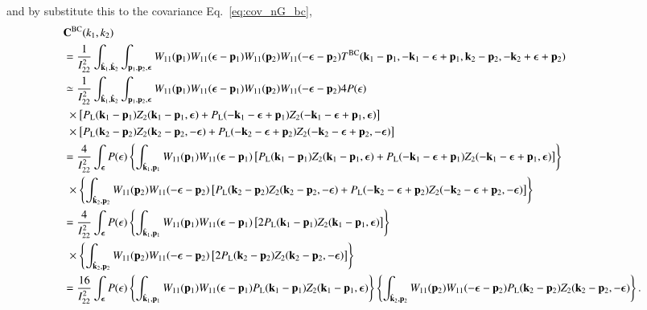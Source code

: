 \documentclass[onecolumn,showpacs,amsmath,amssymb,prd,floatfix,preprintnumbers]{revtex4}
\newcommand{\bk}{{\bf k}}
\newcommand{\bp}{{\bf p}}
\begin{document}
and by substitute this to the covariance Eq.~\ref{eq:cov_nG_bc}, 
\begin{align}
  &{\bf C}^{\rm BC}(k_1,k_2) \nonumber \\ 
  &= \frac{1}{I_{22}^2} \int_{\hat{\bk}_1,\hat{\bk}_2} \int_{\bp_1,\bp_2,{\boldsymbol \epsilon}} W_{11}(\bp_1) W_{11}({\boldsymbol \epsilon}-\bp_1) W_{11}(\bp_2) W_{11}(-{\boldsymbol \epsilon}-\bp_2) T^{\rm BC}(\bk_1-\bp_1, -\bk_1-{\boldsymbol \epsilon}+\bp_1, \bk_2-\bp_2, -\bk_2+{\boldsymbol \epsilon}+\bp_2) \nonumber \\
  &\simeq \frac{1}{I_{22}^2} \int_{\hat{\bk}_1,\hat{\bk}_2} \int_{\bp_1,\bp_2,{\boldsymbol \epsilon}} W_{11}(\bp_1) W_{11}({\boldsymbol \epsilon}-\bp_1) W_{11}(\bp_2) W_{11}(-{\boldsymbol \epsilon}-\bp_2) 4P(\epsilon) \nonumber \\
  &\,\, \times \left[ P_{\rm L}(\bk_1-\bp_1) Z_2(\bk_1-\bp_1, {\boldsymbol \epsilon}) + P_{\rm L}(-\bk_1-{\boldsymbol \epsilon}+\bp_1) Z_2(-\bk_1-{\boldsymbol \epsilon}+\bp_1, {\boldsymbol \epsilon}) \right] \nonumber \\
  &\,\, \times \left[ P_{\rm L}(\bk_2-\bp_2) Z_2(\bk_2-\bp_2, -{\boldsymbol \epsilon}) + P_{\rm L}(-\bk_2-{\boldsymbol \epsilon}+\bp_2) Z_2(-\bk_2-{\boldsymbol \epsilon}+\bp_2, -{\boldsymbol \epsilon}) \right] \nonumber \\
  &= \frac{4}{I_{22}^2} \int_{\boldsymbol \epsilon} P(\epsilon) 
  \left\{ \int_{\hat{\bk}_1,\bp_1} W_{11}(\bp_1) W_{11}({\boldsymbol \epsilon}-\bp_1) \left[ P_{\rm L}(\bk_1-\bp_1) Z_2(\bk_1-\bp_1, {\boldsymbol \epsilon}) + P_{\rm L}(-\bk_1-{\boldsymbol \epsilon}+\bp_1) Z_2(-\bk_1-{\boldsymbol \epsilon}+\bp_1, {\boldsymbol \epsilon}) \right] \right\} \nonumber \\
  &\,\, \times \left\{ \int_{\hat{\bk}_2,\bp_2} W_{11}(\bp_2) W_{11}(-{\boldsymbol \epsilon}-\bp_2) \left[ P_{\rm L}(\bk_2-\bp_2) Z_2(\bk_2-\bp_2, -{\boldsymbol \epsilon}) + P_{\rm L}(-\bk_2-{\boldsymbol \epsilon}+\bp_2) Z_2(-\bk_2-{\boldsymbol \epsilon}+\bp_2, -{\boldsymbol \epsilon}) \right] \right\} \nonumber \\
  &= \frac{4}{I_{22}^2} \int_{\boldsymbol \epsilon} P(\epsilon) 
  \left\{ \int_{\hat{\bk}_1,\bp_1} W_{11}(\bp_1) W_{11}({\boldsymbol \epsilon}-\bp_1) \left[ 2 P_{\rm L}(\bk_1-\bp_1) Z_2(\bk_1-\bp_1, {\boldsymbol \epsilon}) \right] \right\} \nonumber \\
  &\,\, \times \left\{ \int_{\hat{\bk}_2,\bp_2} W_{11}(\bp_2) W_{11}(-{\boldsymbol \epsilon}-\bp_2) \left[ 2 P_{\rm L}(\bk_2-\bp_2) Z_2(\bk_2-\bp_2, -{\boldsymbol \epsilon}) \right] \right\} \nonumber \\
  &= \frac{16}{I_{22}^2} \int_{\boldsymbol \epsilon} P(\epsilon) 
  \left\{ \int_{\hat{\bk}_1,\bp_1} W_{11}(\bp_1) W_{11}({\boldsymbol \epsilon}-\bp_1) P_{\rm L}(\bk_1-\bp_1) Z_2(\bk_1-\bp_1, {\boldsymbol \epsilon}) \right\}
  \left\{ \int_{\hat{\bk}_2,\bp_2} W_{11}(\bp_2) W_{11}(-{\boldsymbol \epsilon}-\bp_2) P_{\rm L}(\bk_2-\bp_2) Z_2(\bk_2-\bp_2, -{\boldsymbol \epsilon}) \right\}.
\end{align}
\end{document}

